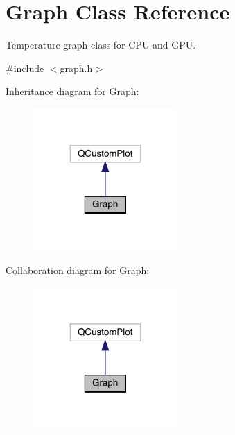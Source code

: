 \hypertarget{classGraph}{}\section{Graph Class Reference}
\label{classGraph}


Temperature graph class for C\+PU and G\+PU.  




{\ttfamily \#include $<$graph.\+h$>$}



Inheritance diagram for Graph\+:\nopagebreak
\begin{figure}[H]
\begin{center}
\leavevmode
\includegraphics[width=155pt]{classGraph__inherit__graph}
\end{center}
\end{figure}


Collaboration diagram for Graph\+:\nopagebreak
\begin{figure}[H]
\begin{center}
\leavevmode
\includegraphics[width=155pt]{classGraph__coll__graph}
\end{center}
\end{figure}
